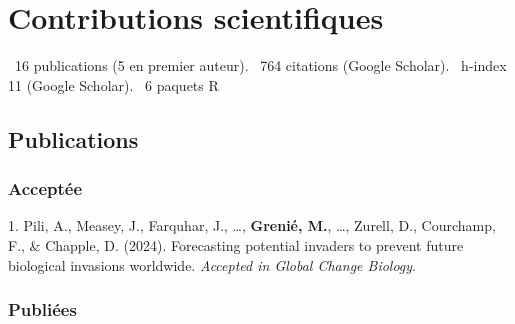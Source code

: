 \documentclass[10pt,a4paper,]{article}
\newlength{\cslhangindent}
\newenvironment{CSLReferences}[2] %
 {\begin{list}{}{%
  \setlength{\itemindent}{0pt}
  \setlength{\leftmargin}{0pt}
  \setlength{\parsep}{0pt}
  \ifodd #1
   \setlength{\leftmargin}{\cslhangindent}
   \setlength{\itemindent}{-1\cslhangindent}
  \fi
  \setlength{\itemsep}{#2\baselineskip}}}
 {\end{list}}
\begin{document}
\section{Contributions scientifiques}\label{contributions-scientifiques}

\faFile*~16 publications (5 en premier auteur). \faQuoteLeft~764
citations (Google Scholar). \faHSquare~h-index 11 (Google Scholar).
\faRProject~6 paquets R

\subsection{Publications}\label{publications}

\subsubsection{Acceptée}\label{acceptuxe9e}

\label{refs-b7e7f3d247ef10bbb35423e631999e1e}
\begin{CSLReferences}{1}{1}
1. Pili, A., Measey, J., Farquhar, J., \ldots, \textbf{Grenié, M.},
\ldots, Zurell, D., Courchamp, F., \& Chapple, D. (2024). Forecasting
potential invaders to prevent future biological invasions worldwide.
\emph{Accepted in Global Change Biology}.

\end{CSLReferences}

\subsubsection{Publiées}\label{publiuxe9es}
\end{document}
